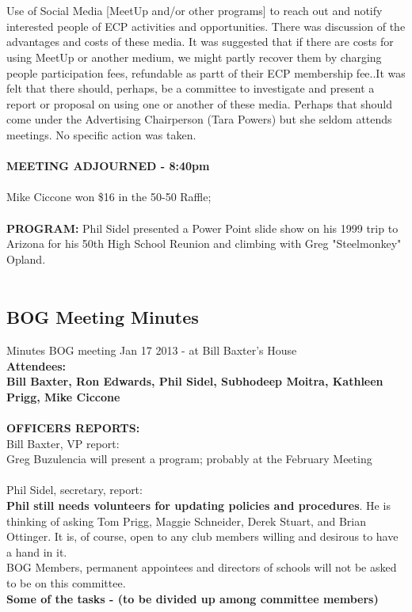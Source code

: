 \documentclass[10pt,a4paper]{article}
\newcommand\subsect[1]{%
  \subsection*{#1}%
  \addcontentsline{toc}{subsection}{#1}}
\begin{document}
\begin{multicols}{2}
\\
\\
Use of Social Media [MeetUp and/or other programs] to reach out and notify interested people of ECP activities and opportunities.   There was discussion of the advantages and costs of these media.  It was suggested that if there are costs for using MeetUp or another medium, we might partly recover them by charging people participation fees, refundable as partt of their ECP membership fee..It was felt that there should, perhaps, be a committee to investigate and present a report or proposal on using one or another of these media.  Perhaps that should come under the Advertising Chairperson (Tara Powers) but she seldom attends meetings.  No specific action was taken.
\\
\\
\textbf{MEETING ADJOURNED - 8:40pm} 
\\
\\
Mike Ciccone won \$16 in the 50-50 Raffle;  
\\
\\
\textbf{PROGRAM:}  Phil Sidel presented a Power Point slide show on his 1999 trip to Arizona for his 50th High School Reunion and climbing with Greg "Steelmonkey" Opland.
\\
\\
\subsect{BOG Meeting Minutes}
{ \large Minutes BOG meeting Jan 17 2013} - at Bill Baxter's House \\
\textbf{Attendees: \\
Bill Baxter, Ron Edwards, Phil Sidel, Subhodeep Moitra, Kathleen Prigg, Mike Ciccone}
\\
\\
\textbf{OFFICERS REPORTS:} \\
Bill Baxter, VP report:\\
   Greg Buzulencia will present a program; probably at the February Meeting
   \\
   \\
Phil Sidel, secretary, report:\\
   \textbf{Phil still needs volunteers for updating policies and procedures}. He is thinking of asking Tom Prigg, 
   Maggie Schneider, Derek Stuart, and Brian Ottinger. It is, of course, open to any club members willing and
     desirous to have a hand in it. \\
   BOG Members, permanent appointees and directors of schools will not be asked to be on this committee.\\
\textbf{   Some of the tasks  -  (to be divided up among committee members)} \\

\end{multicols}
\end{document}
